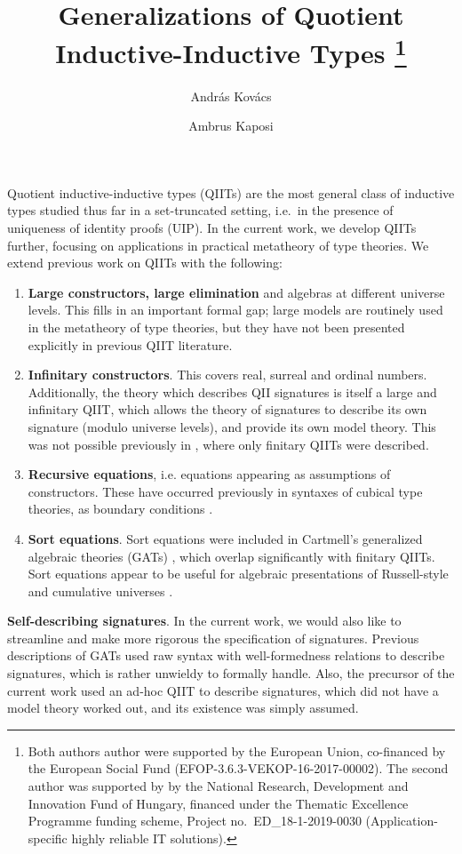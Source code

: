 \documentclass{easychair}
\title{Generalizations of Quotient Inductive-Inductive Types %
  \thanks{Both authors author were supported by the European Union, co-financed
    by the European Social Fund (EFOP-3.6.3-VEKOP-16-2017-00002). The second
    author was supported by by the National Research, Development and Innovation
    Fund of Hungary, financed under the Thematic Excellence Programme funding
    scheme, Project no.\ ED\_18-1-2019-0030 (Application-specific highly
    reliable IT solutions). }}
\author{
Andr\'as Kov\'acs
\and
Ambrus Kaposi
}
\institute{
  E\"otv\"os Lor\'and University,
  Budapest, Hungary \\
  \email{kovacsandras|akaposi@inf.elte.hu}
}
\begin{document}
\maketitle

Quotient inductive-inductive types (QIITs) are the most general class of
inductive types studied thus far in a set-truncated setting, i.e.\ in the
presence of uniqueness of identity proofs (UIP). In the current work, we develop
QIITs further, focusing on applications in practical metatheory of type
theories. We extend previous work on QIITs \cite{kaposi2019constructing} with
the following:
\begin{enumerate}
  \item
  \textbf{Large constructors, large elimination} and algebras at different
  universe levels. This fills in an important formal gap; large models are
  routinely used in the metatheory of type theories, but they have not been
  presented explicitly in previous QIIT literature.
  \item
  \textbf{Infinitary constructors}.
  This covers real, surreal \cite{HoTTbook} and ordinal numbers. Additionally,
  the theory which describes QII signatures is itself a large and infinitary
  QIIT, which allows the theory of signatures to describe its own signature
  (modulo universe levels), and provide its own model theory. This was not
  possible previously in \cite{kaposi2019constructing}, where only finitary
  QIITs were described.
  \item
  \textbf{Recursive equations}, i.e. equations appearing as assumptions of
  constructors. These have occurred previously in syntaxes of cubical type
  theories, as boundary conditions \cite{cohen2016cubical,
    angiuli2016computational, angiuli2018cartesian}.
  \item
  \textbf{Sort equations}. Sort equations were included in Cartmell's
  generalized algebraic theories (GATs) \cite{gat}, which overlap significantly
  with finitary QIITs. Sort equations appear to be useful for algebraic
  presentations of Russell-style and cumulative universes
  \cite{sterling2019algebraic}.
\end{enumerate}

\textbf{Self-describing signatures}. In the current work, we
would also like to streamline and make more rigorous the specification of
signatures. Previous descriptions of GATs \cite{gat, sterling2019algebraic} used
raw syntax with well-formedness relations to describe signatures, which is
rather unwieldy to formally handle. Also, the precursor of the current work
\cite{kaposi2019constructing} used an ad-hoc QIIT to describe signatures, which
did not have a model theory worked out, and its existence was simply assumed.
\end{document}
